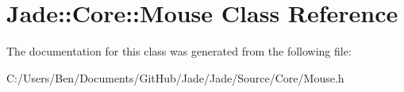\hypertarget{class_jade_1_1_core_1_1_mouse}{}\section{Jade\+:\+:Core\+:\+:Mouse Class Reference}
\label{class_jade_1_1_core_1_1_mouse}


The documentation for this class was generated from the following file\+:\begin{DoxyCompactItemize}
\item 
C\+:/\+Users/\+Ben/\+Documents/\+Git\+Hub/\+Jade/\+Jade/\+Source/\+Core/Mouse.\+h\end{DoxyCompactItemize}
